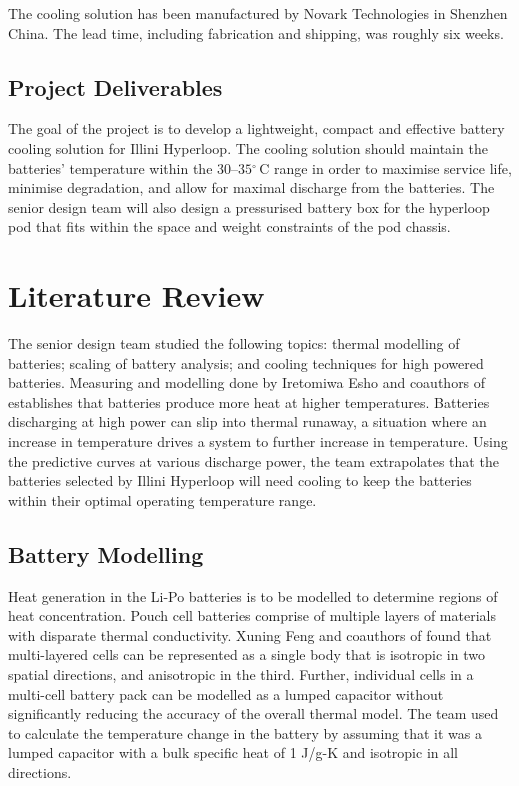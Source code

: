 \documentclass[11pt]{article}
\numberwithin{equation}{subsection} %
\newcommand{\degrees}{\ensuremath{^\circ}} %
\newcommand{\unit}[1]{\ensuremath{\, \mathrm{#1}}}             %
\begin{document}
The cooling solution has been manufactured by Novark Technologies in Shenzhen China. The lead time, including fabrication and shipping, was roughly six weeks.

\subsection{Project Deliverables}
The goal of the project is to develop a lightweight, compact and effective battery cooling solution for Illini Hyperloop. The cooling solution should maintain the batteries' temperature within the 30--$35\degrees\unit{C}$ range in order to maximise service life, minimise degradation, and allow for maximal discharge from the batteries. The senior design team will also design a pressurised battery box for the hyperloop pod that fits within the space and weight constraints of the pod chassis.


\section{Literature Review}

The senior design team studied the following topics: thermal modelling of batteries; scaling of battery analysis; and cooling techniques for high powered batteries. Measuring and modelling done by Iretomiwa Esho and coauthors of \cite{runaway} establishes that batteries produce more heat at higher temperatures. Batteries discharging at high power can slip into thermal runaway, a situation where an increase in temperature drives a system to further increase in temperature. Using the predictive curves at various discharge power, the team extrapolates that the batteries selected by Illini Hyperloop will need cooling to keep the batteries within their optimal operating temperature range.

\subsection{Battery Modelling}

Heat generation in the Li-Po batteries is to be modelled to determine regions of heat concentration. Pouch cell batteries comprise of multiple layers of materials with disparate thermal conductivity. Xuning Feng and coauthors of \cite{thermal} found that multi-layered cells can be represented as a single body that is isotropic in two spatial directions, and anisotropic in the third. Further, individual cells in a multi-cell battery pack can be modelled as a lumped capacitor without significantly reducing the accuracy of the overall thermal model. The team used \cite{thermal} to calculate the temperature change in the battery by assuming that it was a lumped capacitor with a bulk specific heat of 1 J/g-K and isotropic in all directions.
\end{document}
